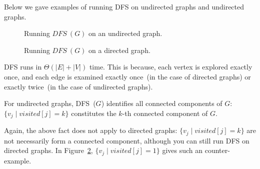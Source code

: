 \begin{minipage}{0.8\textwidth}
	\xxx
	\xxx
	\xxx
	\xxx
	\xxx
	\xxx
	\xxx
	\xxx
	\xxx
	\xxx
\end{minipage}


\begin{minipage}{0.8\textwidth}
	\xxx
	\xxx
	\xxx
	\xxx
	\xxx
	\xxx
\end{minipage}

Below we gave examples of running DFS on undirected graphs and undirected graphs.

\begin{figure}[h!]
\centering{}
\caption{Running $DFS~(G)$ on an undirected graph.}
\label{fig:dfs-undirected}
\end{figure}

\begin{figure}[h!]
\centering{}
\caption{Running $DFS~(G)$ on a directed graph.}
\label{fig:dfs-directed}
\end{figure}

DFS runs in $\Theta(|E| + |V|)$ time. This is because, each vertex
is explored exactly once, and each edge is examined exactly once~(in the case of directed graphs)
or exactly twice~(in the case of undirected graphs).

\begin{fact}
For undirected graphs, DFS~($G$) identifies all connected components of $G$:
	$\{v_j \mid visited[j] = k \}$ constitutes the $k$-th connected component of $G$.
\end{fact}

Again, the above fact does not apply to directed graphs: $\{v_j \mid visited[j] = k\}$
are not necessarily form a connected component, although you can still run DFS on directed graphs. In
Figure~\ref{fig:dfs-directed}, $\{v_j \mid visited[j] = 1\}$ gives such an counter-example. 
